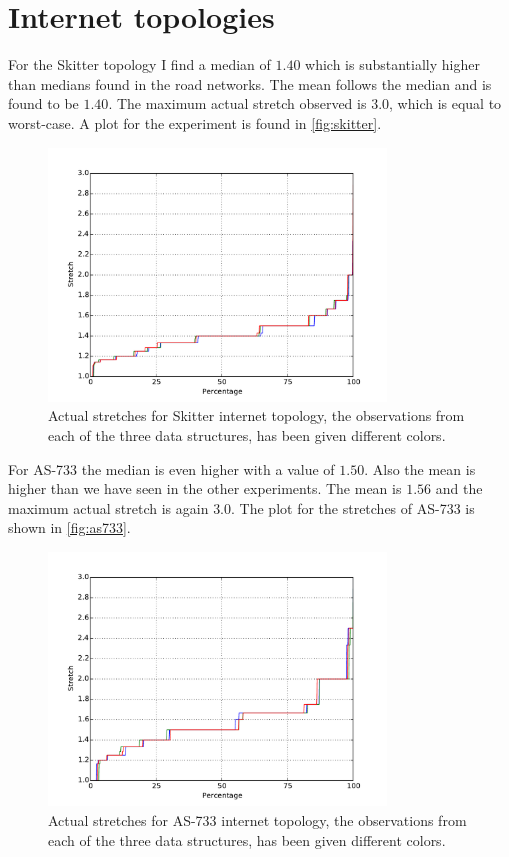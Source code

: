 \section{Internet topologies}

For the Skitter topology I find a median of $1.40$ which is substantially
higher than medians found in the road networks. The mean follows the
median and is found to be $1.40$. The maximum actual stretch observed is
$3.0$, which is equal to worst-case. A plot for the experiment is found in
\autoref{fig:skitter}.
\begin{figure}[htbp]
    \centering
    \includegraphics[width=0.8\textwidth]{plots/as_skitter.pdf}
    \caption{Actual stretches for Skitter internet topology, the observations
    from each of the three data structures, has been given different colors.}
    \label{fig:skitter}
\end{figure}

For AS-733 the median is even higher with a value of $1.50$. Also the mean
is higher than we have seen in the other experiments. The mean is $1.56$ and
the maximum actual stretch is again $3.0$. The plot for the stretches of
AS-733 is shown in \autoref{fig:as733}.
\begin{figure}[htbp]
    \centering
    \includegraphics[width=0.8\textwidth]{plots/as_733.pdf}
    \caption{Actual stretches for AS-733 internet topology, the observations
    from each of the three data structures, has been given different colors.}
    \label{fig:as733}
\end{figure}

